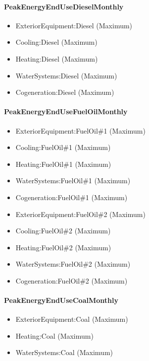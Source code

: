 \paragraph{PeakEnergyEndUseDieselMonthly}\label{peakenergyendusedieselmonthly}

\begin{itemize}
\item
  ExteriorEquipment:Diesel (Maximum)
\item
  Cooling:Diesel (Maximum)
\item
  Heating:Diesel (Maximum)
\item
  WaterSystems:Diesel (Maximum)
\item
  Cogeneration:Diesel (Maximum)
\end{itemize}

\paragraph{PeakEnergyEndUseFuelOilMonthly}\label{peakenergyendusefueloilmonthly}

\begin{itemize}
\item
  ExteriorEquipment:FuelOil\#1 (Maximum)
\item
  Cooling:FuelOil\#1 (Maximum)
\item
  Heating:FuelOil\#1 (Maximum)
\item
  WaterSystems:FuelOil\#1 (Maximum)
\item
  Cogeneration:FuelOil\#1 (Maximum)
\item
  ExteriorEquipment:FuelOil\#2 (Maximum)
\item
  Cooling:FuelOil\#2 (Maximum)
\item
  Heating:FuelOil\#2 (Maximum)
\item
  WaterSystems:FuelOil\#2 (Maximum)
\item
  Cogeneration:FuelOil\#2 (Maximum)
\end{itemize}

\paragraph{PeakEnergyEndUseCoalMonthly}\label{peakenergyendusecoalmonthly}

\begin{itemize}
\item
  ExteriorEquipment:Coal (Maximum)
\item
  Heating:Coal (Maximum)
\item
  WaterSystems:Coal (Maximum)
\end{itemize}

